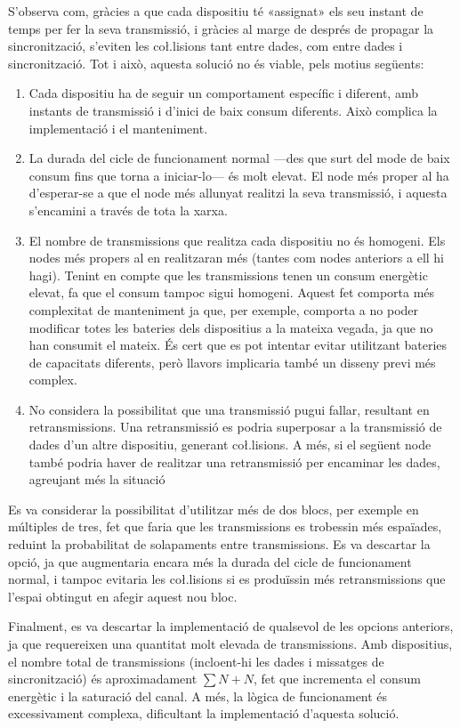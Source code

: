 \documentclass{tfgitic}[2024/07/01]
\begin{document}
{S'observa com, gràcies a que cada dispositiu té «assignat» els seu instant de temps per fer la seva transmissió, i gràcies al marge de després de propagar la sincronització, s'eviten les co\l.lisions tant entre dades, com entre dades i sincronització. Tot i això, aquesta solució no és viable, pels motius següents:
\begin{enumerate}
    \item Cada dispositiu ha de seguir un comportament específic i diferent, amb instants de transmissió i d'inici de baix consum diferents. Això complica la implementació i el manteniment.
    \item La durada del cicle de funcionament normal ---des que surt del mode de baix consum fins que torna a iniciar-lo--- és molt elevat. El node més proper al  ha d'esperar-se a que el node més allunyat realitzi la seva transmissió, i aquesta s'encamini a través de tota la xarxa.  
    \item El nombre de transmissions que realitza cada dispositiu no és homogeni. Els nodes més propers al  en realitzaran més (tantes com nodes anteriors a ell hi hagi). Tenint en compte que les transmissions tenen un consum energètic elevat, fa que el consum tampoc sigui homogeni. Aquest fet comporta més complexitat de manteniment ja que, per exemple, comporta a no poder modificar totes les bateries dels dispositius a la mateixa vegada, ja que no han consumit el mateix. És cert que es pot intentar evitar utilitzant bateries de capacitats diferents, però llavors implicaria també un disseny previ més complex.
    \item No considera la possibilitat que una transmissió pugui fallar, resultant en retransmissions. Una retransmissió es podria superposar a la transmissió de dades d'un altre dispositiu, generant co\l.lisions. A més, si el següent node també podria haver de realitzar una retransmissió per encaminar les dades, agreujant més la situació 
\end{enumerate}

Es va considerar la possibilitat d'utilitzar més de dos blocs, per exemple en múltiples de tres, fet que faria que les transmissions es trobessin més espaïades, reduint la probabilitat de solapaments entre transmissions. Es va descartar la opció, ja que augmentaria encara més la durada del cicle de funcionament normal, i tampoc evitaria les co\l.lisions si es produïssin més retransmissions que l'espai obtingut en afegir aquest nou bloc.

Finalment, es va descartar la implementació de qualsevol de les opcions anteriors, ja que requereixen una quantitat molt elevada de transmissions. Amb  dispositius, el nombre total de transmissions (incloent-hi les dades i missatges de sincronització) és aproximadament $\sum{N} + N$, fet que incrementa el consum energètic i la saturació del canal. A més, la lògica de funcionament és excessivament complexa, dificultant la implementació d'aquesta solució. 

}
\end{document}
